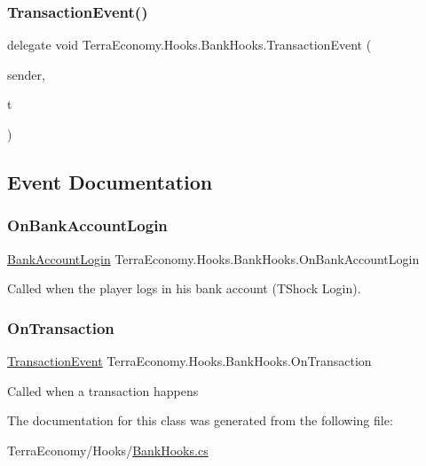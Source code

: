 \subsubsection{\texorpdfstring{Transaction\+Event()}{TransactionEvent()}}
{\footnotesize\ttfamily delegate void Terra\+Economy.\+Hooks.\+Bank\+Hooks.\+Transaction\+Event (\begin{DoxyParamCaption}\item[{T\+S\+Player}]{sender,  }\item[{\hyperlink{class_terra_economy_1_1_util_1_1_transaction}{Transaction}}]{t }\end{DoxyParamCaption})}



\subsection{Event Documentation}
\mbox{\label{class_terra_economy_1_1_hooks_1_1_bank_hooks_a77d0ace226a52bb1587e1a17f0d4a826}} 
\subsubsection{\texorpdfstring{On\+Bank\+Account\+Login}{OnBankAccountLogin}}
{\footnotesize\ttfamily \hyperlink{class_terra_economy_1_1_hooks_1_1_bank_hooks_a4686a5b7f10a6bf6f9e18e9493c7626f}{Bank\+Account\+Login} Terra\+Economy.\+Hooks.\+Bank\+Hooks.\+On\+Bank\+Account\+Login\hspace{0.3cm}{\ttfamily [static]}}



Called when the player logs in his bank account (T\+Shock Login). 

\mbox{\label{class_terra_economy_1_1_hooks_1_1_bank_hooks_a4f5eea31bcacba5ee4ae5f1c8eb5af05}} 
\subsubsection{\texorpdfstring{On\+Transaction}{OnTransaction}}
{\footnotesize\ttfamily \hyperlink{class_terra_economy_1_1_hooks_1_1_bank_hooks_a2474c117fc1cf81a1582effae690e157}{Transaction\+Event} Terra\+Economy.\+Hooks.\+Bank\+Hooks.\+On\+Transaction\hspace{0.3cm}{\ttfamily [static]}}



Called when a transaction happens 



The documentation for this class was generated from the following file\+:\begin{DoxyCompactItemize}
\item 
Terra\+Economy/\+Hooks/\hyperlink{_bank_hooks_8cs}{Bank\+Hooks.\+cs}\end{DoxyCompactItemize}

